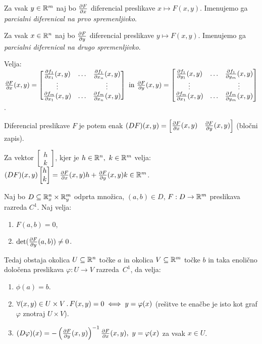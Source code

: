 Za vsak $y \in \mathbb{R}^m$ naj bo $\frac{\partial F}{\partial x}$ diferencial preslikave $x \mapsto F(x,y)$. Imenujemo ga \emph{parcialni diferenical na prvo spremenljivko}. 

Za vsak $x \in \mathbb{R}^n$ naj bo $\frac{\partial F}{\partial y}$ diferencial preslikave $y \mapsto F(x,y)$. Imenujemo ga \emph{parcialni diferenical na drugo spremenljivko}. 

Velja: 
$\frac{\partial F}{\partial x}(x,y) = \begin{bmatrix}
    \frac{\partial f_1}{\partial x_1}(x,y) & \ldots & \frac{\partial f_1}{\partial x_n}(x,y) \\
    \vdots & & \vdots \\
    \frac{\partial f_m}{\partial x_1}(x,y) & \ldots & \frac{\partial f_m}{\partial x_n}(x,y) 
\end{bmatrix} \text{ in } \frac{\partial F}{\partial y}(x,y) = \begin{bmatrix}
    \frac{\partial f_1}{\partial y_1}(x,y) & \ldots & \frac{\partial f_1}{\partial y_m}(x,y) \\
    \vdots & & \vdots \\
    \frac{\partial f_m}{\partial x_1}(x,y) & \ldots & \frac{\partial f_m}{\partial y_m}(x,y) 
\end{bmatrix}$.

Diferencial preslikave $F$ je potem enak $(DF)(x,y) = \begin{bmatrix}
    \frac{\partial F}{\partial x}(x,y) & \frac{\partial F}{\partial y}(x,y)
\end{bmatrix}$ (bločni zapis).

\begin{opomba}
    Za vektor $\begin{bmatrix}
        h \\ k
    \end{bmatrix}$, kjer je $h \in \mathbb{R}^n, \ k \in \mathbb{R}^m$ velja: $(DF)(x,y)  \begin{bmatrix}
        h \\ k
    \end{bmatrix} = \frac{\partial F}{\partial x}(x,y)  h + \frac{\partial F}{\partial y}(x,y)  k \in \mathbb{R}^m$.
\end{opomba}

\begin{izrek}
    Naj bo $D\subseteq \mathbb{R}_x^n \times \mathbb{R}_y^m$ odprta množica, $(a, b) \in D$, $F: D \to \mathbb{R}^m$ preslikava razreda $C^1$. Naj velja:
    \begin{enumerate}
        \item $F(a, b) = 0$,
        \item $\det(\frac{\partial F}{\partial y}(a,b)) \neq 0$.
    \end{enumerate}
    Tedaj obstaja okolica $U \subseteq \mathbb{R}^n$ točke $a$ in okolica $V \subseteq \mathbb{R}^m$ točke $b$ in taka enolično določena preslikava $\varphi: U \to V$ razreda~$C^1$, da velja:
    \begin{enumerate}
        \item $\phi(a) = b$.
        \item $\forall (x,y) \in U \times V \,.\, F(x,y) = 0 \iff y = \varphi(x)$ (rešitve te enačbe je isto kot graf $\varphi$ znotraj $U \times V$).
        \item $(D \varphi)(x) = - \left(\frac{\partial F}{\partial y}(x,y)\right)^{-1} \frac{\partial F}{\partial x}(x,y), \ y = \varphi(x)$ za vsak $x \in U$.
    \end{enumerate}
\end{izrek}

